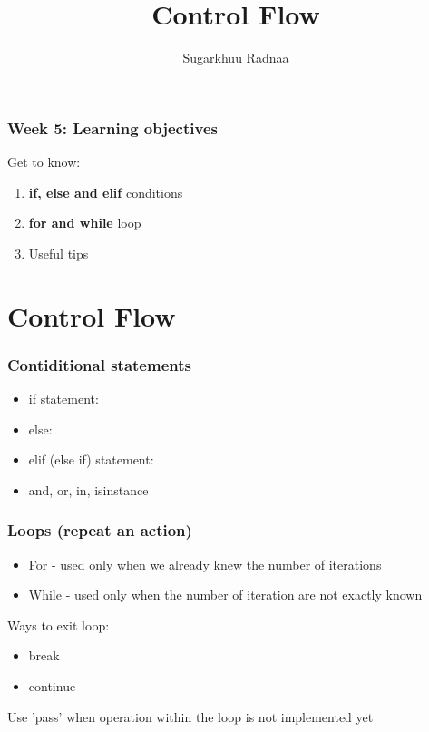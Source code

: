 \documentclass{beamer}
\title[Introduction to Python]{Control Flow}
\author{Sugarkhuu Radnaa}
\institute[]
{
Py4Econ in Ulaanbaatar \\ 
\medskip
\textit{py4econ@gmail.com} 
}
\date{}  %
\begin{document}
\begin{frame}
\titlepage %
\end{frame}

\begin{frame}
    \frametitle{Week 5: Learning objectives}
    Get to know: 
    \begin{enumerate}
        \item \textbf{if, else and elif} conditions
        \item \textbf{for and while} loop
        \item Useful tips
    \end{enumerate}
\end{frame}

\section{Control Flow} 

\begin{frame}
    \frametitle{Contiditional statements}
    \begin{itemize}
        \item if statement:
        \item else:
        \item elif (else if) statement:  
        \item and, or, in, isinstance
    \end{itemize}
\end{frame}

\begin{frame}
    \frametitle{Loops (repeat an action)}
    \begin{itemize}
        \item For - used only when we already knew the number of iterations
        \item While - used only when the number of iteration are not exactly known
    \end{itemize}

    Ways to exit loop:
    \begin{itemize}
        \item break
        \item continue
    \end{itemize}
    
    Use 'pass' when operation within the loop is not implemented yet
\end{frame}
\end{document}
